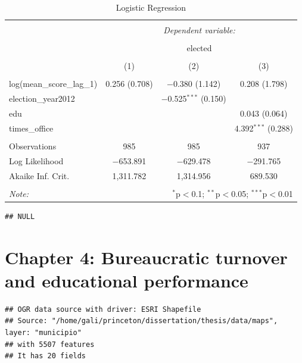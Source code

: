 \documentclass[12pt,]{article}
\begin{document}
\begin{table}[!htbp] \centering 
  \caption{Logistic Regression} 
  \label{} 
\begin{tabular}{@{\extracolsep{5pt}}lccc} 
\\[-1.8ex]\hline 
\hline \\[-1.8ex] 
 & \multicolumn{3}{c}{\textit{Dependent variable:}} \\ 
\cline{2-4} 
\\[-1.8ex] & \multicolumn{3}{c}{elected} \\ 
\\[-1.8ex] & (1) & (2) & (3)\\ 
\hline \\[-1.8ex] 
 log(mean\_score\_lag\_1) & 0.256 (0.708) & $-$0.380 (1.142) & 0.208 (1.798) \\ 
  election\_year2012 &  & $-$0.525$^{***}$ (0.150) &  \\ 
  edu &  &  & 0.043 (0.064) \\ 
  times\_office &  &  & 4.392$^{***}$ (0.288) \\ 
 \hline \\[-1.8ex] 
Observations & 985 & 985 & 937 \\ 
Log Likelihood & $-$653.891 & $-$629.478 & $-$291.765 \\ 
Akaike Inf. Crit. & 1,311.782 & 1,314.956 & 689.530 \\ 
\hline 
\hline \\[-1.8ex] 
\textit{Note:}  & \multicolumn{3}{r}{$^{*}$p$<$0.1; $^{**}$p$<$0.05; $^{***}$p$<$0.01} \\ 
\end{tabular} 
\end{table}

\begin{verbatim}
## NULL
\end{verbatim}

\pagebreak

\hypertarget{chapter-4-bureaucratic-turnover-and-educational-performance}{%
\section{Chapter 4: Bureaucratic turnover and educational
performance}\label{chapter-4-bureaucratic-turnover-and-educational-performance}}

\begin{verbatim}
## OGR data source with driver: ESRI Shapefile 
## Source: "/home/gali/princeton/dissertation/thesis/data/maps", layer: "municipio"
## with 5507 features
## It has 20 fields
\end{verbatim}
\end{document}
